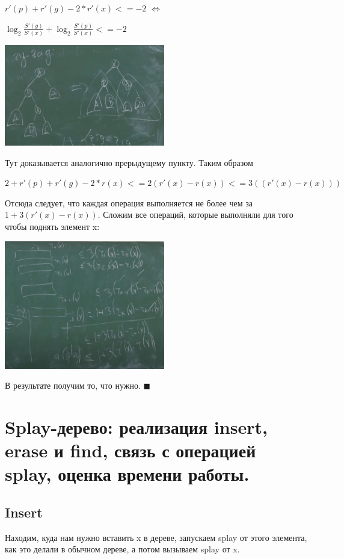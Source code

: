 \begin{itemize}
$r'(p) + r'(g) - 2*r'(x) <= -2$
$\Leftrightarrow$

$ \log_{2}{\frac{S'(g)}{S'(x)}} + \log_{2}{\frac{S'(p)}{S'(x)}} <= -2$

\includegraphics[width = 7cm]{images/47-50_zzp@}

Тут доказывается аналогично прерыдущему пункту. Таким образом

$ 2 + r'(p) + r'(g) - 2*r(x) <= 2(r'(x) - r(x)) <= 3((r'(x) - r(x)))$

\end{itemize}

Отсюда следует, что каждая операция выполняется не более чем за $1 + 3( r'(x) - r(x))$. Сложим все операций, которые выполняли для того чтобы поднять элемент x:

\includegraphics[width = 7cm]{images/47-50_zzzend}

В результате получим то, что нужно.
$\blacksquare$

\section{Splay-дерево: реализация insert, erase и find, связь с операцией splay, оценка времени работы.}

\subsection*{Insert }

Находим, куда нам нужно вставить x в дереве, запускаем splay от этого элемента, как это делали в обычном дереве, а потом вызываем splay от x. 

